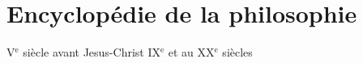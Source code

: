 
\section{Encyclopédie de la philosophie}
%


{\footnotesize V}$^\text{e}$ siècle avant Jesus-Christ
{\footnotesize IX}$^\text{e}$  et au {\footnotesize XX}$^\text{e}$ siècles

